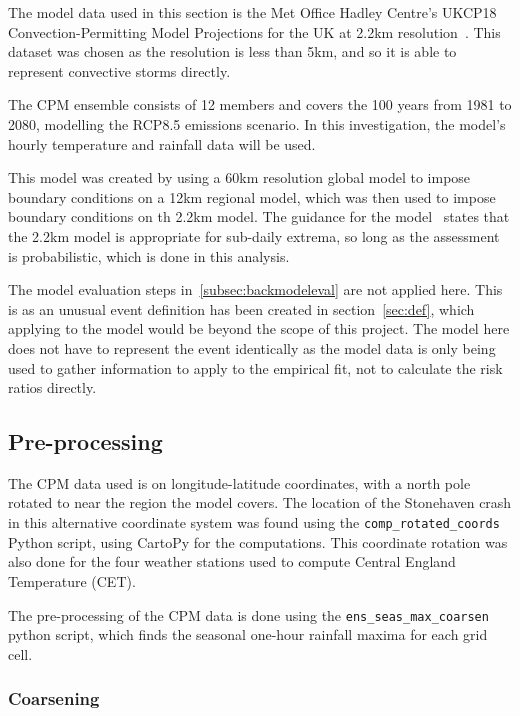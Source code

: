 The model data used in this section is
    the Met Office Hadley Centre's UKCP18 Convection-Permitting Model Projections for the UK at 2.2km resolution~\cite{model_data}.
This dataset was chosen as the resolution is less than 5km,
    and so it is able to represent convective storms directly.

The CPM ensemble consists of 12 members and covers the 100 years from 1981 to 2080,
    modelling the RCP8.5 emissions scenario.
In this investigation,
    the model's hourly temperature and rainfall data will be used.

This model was created by using a 60km resolution global model to impose boundary conditions on a 12km regional model,
    which was then used to impose boundary conditions on th 2.2km model.
The guidance for the model~\cite{model_data} states that the 2.2km model is appropriate for sub-daily extrema,
    so long as the assessment is probabilistic,
    which is done in this analysis.

The model evaluation steps in~\ref{subsec:backmodeleval} are not applied here.
This is as an unusual event definition has been created in section~\ref{sec:def},
    which applying to the model would be beyond the scope of this project.
The model here does not have to represent the event identically as the model data is only being used to gather information
    to apply to the empirical fit,
    not to calculate the risk ratios directly.

\subsection{Pre-processing}\label{subsec:preprocess}

The CPM data used is on longitude-latitude coordinates,
    with a north pole rotated to near the region the model covers.
The location of the Stonehaven crash in this alternative coordinate system was found using the \texttt{comp\_rotated\_coords}~\cite{Me_Code} Python script,
    using CartoPy for the computations.
This coordinate rotation was also done for the four weather stations used to compute Central England Temperature (CET).

The pre-processing of the CPM data is done using the \texttt{ens\_seas\_max\_coarsen}~\cite{Me_Code} python script,
    which finds the seasonal one-hour rainfall maxima for each grid cell.

\subsubsection{Coarsening}

